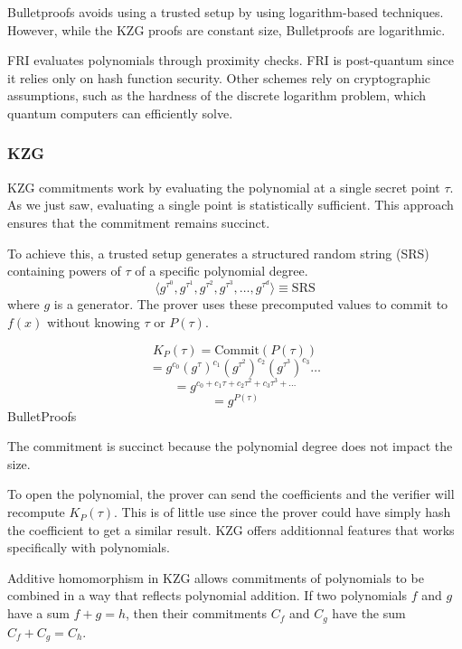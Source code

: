 Bulletproofs avoids using a trusted setup by using logarithm-based techniques\cite{BP18}. 
However, while the KZG proofs are constant size, Bulletproofs are logarithmic.

FRI evaluates polynomials through proximity checks.\cite{FRI} FRI is post-quantum since it relies only on hash function security. 
Other schemes rely on cryptographic assumptions, such as the hardness of the discrete logarithm problem, which quantum computers can efficiently solve.


\subsubsection{KZG}
KZG commitments work by evaluating the polynomial at a single secret point $\tau$. 
As we just saw, evaluating a single point is statistically sufficient.
This approach ensures that the commitment remains succinct.

To achieve this, a trusted setup generates a structured random string (SRS) containing powers of $\tau$
of a specific polynomial degree. 
\[
\langle g^{\tau^0}, g^{\tau^1}, g^{\tau^2}, g^{\tau^3}, \dots, g^{\tau^d} \rangle \equiv \text{SRS}
\]
where \( g \) is a generator.  
The prover uses these precomputed values to commit to \( f(x) \) without knowing \( \tau \) or \( P(\tau) \).

\begin{equation*}
 K_P(\tau) = \text{Commit}(P(\tau))
\end{equation*}
\begin{equation*}
 = g^{c_0} (g^\tau)^{c_1} (g^{\tau^2})^{c_2} (g^{\tau^3})^{c_3} \dots
\end{equation*}
\begin{equation*}
 = g^{c_0 + c_1 \tau + c_2 \tau^2 + c_3 \tau^3 + \dots}
\end{equation*}
\begin{equation*}
 = g^{P(\tau)}
\end{equation*}BulletProofs

The commitment is succinct because the polynomial degree does not impact the size.


To open the polynomial, the prover can send the coefficients and the verifier will recompute $K_P(\tau)$.
This is of little use since the prover could have simply hash the coefficient to get a similar result.
KZG offers additionnal features that works specifically with polynomials.

Additive homomorphism in KZG allows commitments of polynomials to be combined in a way that reflects polynomial addition. 
If two polynomials $f$ and $g$ have a sum $f + g = h$, then their commitments $C_f$ and $C_g$ have the sum $C_f + C_g = C_h$.

